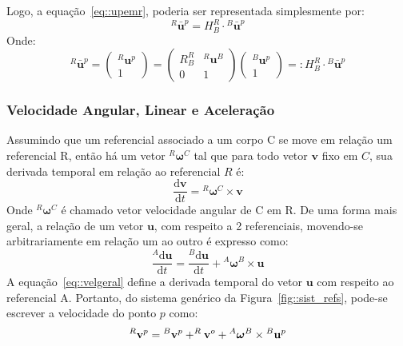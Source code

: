 Logo, a equação~\ref{eq::upemr}, poderia ser representada simplesmente por:
%
\begin{equation}
	^R\bar{\mathbf{u}}^p = H_B^R \cdot {^B}\bar{\mathbf{u}}^p
\end{equation}
%
Onde:
%
\begin{equation}
	^R\bar{\mathbf{u}}^p = \begin{pmatrix}
^R\mathbf{u}^p\\ 
1
\end{pmatrix}
=
\begin{pmatrix}
R_B^R & {^R}\mathbf{u}^B\\ 
0 & 1
\end{pmatrix}
\begin{pmatrix}
^B\mathbf{u}^{p}\\ 
1
\end{pmatrix} =: H_B^R \cdot {^B}\bar{\mathbf{u}}^{p}
\end{equation}


\subsubsection{Velocidade Angular, Linear e Aceleração}

Assumindo que um referencial associado a um corpo C se move em relação
um referencial R, então há um vetor $^{R}\boldsymbol{\omega}^{C}$ tal que para
todo vetor $\mathbf{v}$ fixo em $C$, sua derivada temporal em relação ao
referencial $R$ é:
%
\begin{equation}
	\frac{\mathrm{d} \mathbf{v}}{\mathrm{d} t} = {}^{R}\boldsymbol{\omega}^{C}
	\times \mathbf{v}
\end{equation}
%
Onde ${}^{R}\boldsymbol{\omega}^{C}$ é chamado vetor velocidade angular
de C em R.
De uma forma mais geral, a relação de um vetor $\mathbf{u}$, com respeito a 2
referenciais, movendo-se arbitrariamente em relação um ao outro é expresso como:
%
\begin{equation} \label{eq::velgeral}
	\frac{^{A}\mathrm{d} \mathbf{u}}{\mathrm{d} t} = \frac{^{B}\mathrm{d}
	\mathbf{u}}{\mathrm{d} t} + {}^{A}\boldsymbol{\omega}^{B} \times \mathbf{u}
\end{equation}
%
A equação~\ref{eq::velgeral} define a derivada temporal do vetor $\mathbf{u}$
com respeito ao referencial A. Portanto, do sistema genérico da
Figura~\ref{fig::sist_refs}, pode-se escrever a velocidade do ponto $p$ como:
%
\begin{equation}
	^{R}\mathbf{v}^{p} = {}^{B}\mathbf{v}^{p} + ^{R}\mathbf{v}^{o} +
	{}^{A}\boldsymbol{\omega}^{B} \times {}^{B}\textrm{\textbf{u}}^{p}
\end{equation}
%

